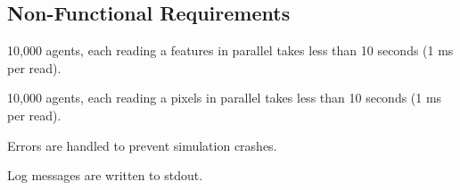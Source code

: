 \subsection{Non-Functional Requirements}
\reqstartNF
	\item 10,000 agents, each reading a features in parallel takes less than 10 seconds (1 ms per read).
	\item 10,000 agents, each reading a pixels in parallel takes less than 10 seconds (1 ms per read).
	\item Errors are handled to prevent simulation crashes.
	\item Log messages are written to stdout.
\reqendNF
